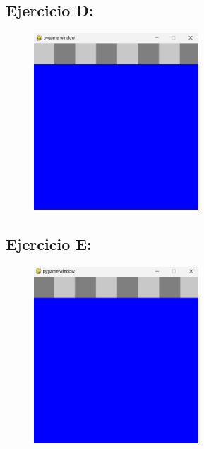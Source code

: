 \documentclass{article}
\begin{document}
	\subsection{Ejercicio D:}
	
	\begin{figure}[H]
		\centering
		\includegraphics[width=0.55\textwidth,keepaspectratio]{img/Picture D.png}
	\end{figure}	
	
	\subsection{Ejercicio E:}
	
	\begin{figure}[H]
		\centering
		\includegraphics[width=0.55\textwidth,keepaspectratio]{img/Picture E.png}
	\end{figure}	
	
\end{document}

